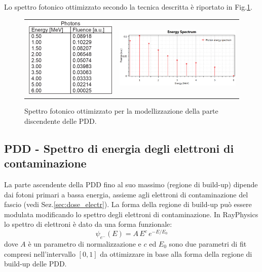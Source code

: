Lo spettro fotonico ottimizzato secondo la tecnica descritta è riportato in Fig.\ref{fig:Ray_spectr_fot}.
\begin{figure}
\centering
\begin{tabular}{m{}m{}}
\vspace*{-0.5cm}\includegraphics[width=.32\textwidth]{./cap2/Ray_spectrum_fot_tab.png} &
\includegraphics[width=.65\textwidth]{./cap2/Ray_spectrum_fot.png}
\end{tabular}
\caption{Spettro fotonico ottimizzato per la modellizzazione della parte discendente delle PDD.}
\label{fig:Ray_spectr_fot}
\end{figure}

\subsection{PDD - Spettro di energia degli elettroni di contaminazione}
La parte ascendente della PDD fino al suo massimo (regione di build-up) dipende dai fotoni primari a bassa energia, assieme agli elettroni di contaminazione del fascio (vedi Sez.\ref{sec:dose_electr}). La forma della regione di build-up può essere modulata modificando lo spettro degli elettroni di contaminazione. In RayPhysics lo spettro di elettroni è dato da una forma funzionale:
\begin{equation}
\psi_{e^-} (E) = A\,E^c\, e^{-E/E_0}
\end{equation}
dove $A$ è un parametro di normalizzazione e $c$ ed $E_0$ sono due parametri di fit compresi nell'intervallo $[0,1]$ da ottimizzare in base alla forma della regione di build-up delle PDD.


